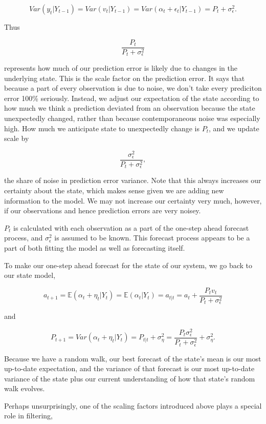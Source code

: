 \documentclass{tufte-book}
\begin{document}
\[
Var(y_t | Y_{t-1}) = Var(v_t | Y_{t-1}) = Var(\alpha_t + \epsilon_t | Y_{t-1}) = P_t + \sigma_\epsilon^2.
\]

\noindent Thus

\[
\frac{P_t}{P_t + \sigma_\epsilon^2}
\]

\noindent represents how much of our prediction error is likely due to changes in the underlying state. This is the scale factor on the prediction error. It says that because a part of every observation is due to noise, we don't take every prediciton error 100\% seriously. Instead, we adjust our expectation of the state according to how much we think a prediction deviated from an observation because the state unexpectedly changed, rather than because contemporaneous noise was especially high. How much we anticipate state to unexpectedly change is $P_t$, and we update scale by

\[
\frac{\sigma_\epsilon^2}{P_t + \sigma_\epsilon^2},
\]

\noindent the share of noise in prediction error variance. Note that this always increases our certainty about the state, which makes sense given we are adding new information to the model. We may not increase our certainty very much, however, if our observations and hence prediction errors are very noisey.

$P_t$ is calculated with each observation as a part of the one-step ahead forecast process, and $\sigma_\epsilon^2$ is assumed to be known. This forecast process appears to be a part of both fitting the model as well as forecasting itself.

To make our one-step ahead forecast for the state of our system, we go back to our state model,

\[
a_{t+1} = \mathbb{E}(\alpha_t + \eta_t | Y_t) = \mathbb{E}(\alpha_t | Y_t) = a_{t|t} = a_t + \frac{P_t v_t}{P_t + \sigma_\epsilon^2}
\]

\noindent and

\[
P_{t+1} = Var(\alpha_t + \eta_t | Y_t) = P_{t|t} + \sigma_\eta^2 = \frac{P_t \sigma_\epsilon^2}{P_t + \sigma_\epsilon^2} + \sigma_\eta^2.
\]

\noindent Because we have a random walk, our best forecast of the state's mean is our most up-to-date expectation, and the variance of that forecast is our most up-to-date variance of the state plus our current understanding of how that state's random walk evolves.

Perhaps unsurprisingly, one of the scaling factors introduced above plays a special role in filtering, 
\end{document}
